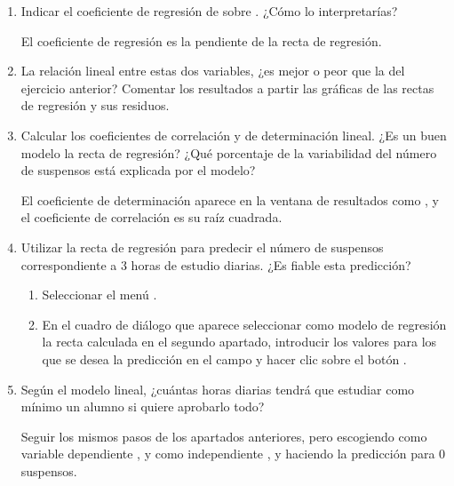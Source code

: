 \begin{enumerate}[leftmargin=*]
\begin{enumerate}
\item Indicar el coeficiente de regresión de  sobre . 
¿Cómo lo interpretarías?
\begin{indicacion}
El coeficiente de regresión es la pendiente de la recta de regresión.
\end{indicacion}

\item La relación lineal entre estas dos variables, ¿es mejor o peor que la del ejercicio anterior? 
Comentar los resultados a partir las gráficas de las rectas de regresión y sus residuos.

\item Calcular los coeficientes de correlación y de determinación lineal. 
¿Es un buen modelo la recta de regresión?
¿Qué porcentaje de la variabilidad del número de suspensos está explicada por el modelo?
\begin{indicacion}
El coeficiente de determinación aparece en la ventana de resultados como , y el
coeficiente de correlación es su raíz cuadrada.
\end{indicacion}

\item Utilizar la recta de regresión para predecir el número de suspensos correspondiente a 3 horas de estudio diarias.
¿Es fiable esta predicción? 
\begin{indicacion}
\begin{enumerate}
\item Seleccionar el menú .
\item En el cuadro de diálogo que aparece seleccionar como modelo de regresión la recta calculada en el segundo
apartado, introducir los valores para los que se desea la predicción en el campo  y hacer clic
sobre el botón .
\end{enumerate}
\end{indicacion}

\item Según el modelo lineal, ¿cuántas horas diarias tendrá que estudiar como mínimo un alumno si quiere aprobarlo
todo?
\begin{indicacion}
Seguir los mismos pasos de los apartados anteriores, pero escogiendo como variable dependiente ,
y como independiente , y haciendo la predicción para 0 suspensos.
\end{indicacion}
\end{enumerate}



\end{enumerate}
